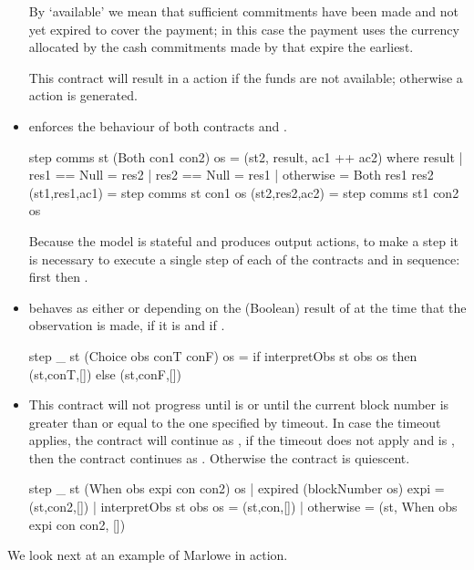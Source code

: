 \documentclass[
      acmsmall
    , screen
  ]{acmart}
\begin{document}
\begin{itemize}
By `available' we mean that sufficient commitments have 
been made and  not yet expired to cover the payment; in this case the payment  uses the currency allocated by the cash 
commitments made by  that expire the earliest.

 This contract will result in a  action if the funds are not available; otherwise a  action is generated.

\item {} enforces the behaviour of both contracts  and . 

\smallskip
\begin{haskellcode}
step comms st (Both con1 con2) os =
    (st2, result, ac1 ++ ac2)
    where
        result | res1 == Null = res2
               | res2 == Null = res1
               | otherwise = Both res1 res2
        (st1,res1,ac1) = step comms st con1 os
        (st2,res2,ac2) = step comms st1 con2 os
\end{haskellcode}
\smallskip

Because the model is stateful and produces output actions, to make a step it is necessary to execute a single step of each of  the contracts  and  in sequence: first  then .

\item {} behaves as either  or  depending on the (Boolean) result of  at the time that the observation is made,  if it is  and  if .

\smallskip
\begin{haskellcode}
step _ st (Choice obs conT conF) os =
    if interpretObs st obs os
        then (st,conT,[])
        else (st,conF,[])
\end{haskellcode}
\smallskip

\item {} This contract will not progress until  is  or until the current block number is greater than or equal to the one specified by timeout. In case the timeout applies, the contract will continue as , if the timeout does not apply and  is , then the contract continues as . Otherwise the contract is quiescent.

\smallskip
\begin{haskellcode}
step _ st (When obs expi con con2) os
  | expired (blockNumber os) expi = (st,con2,[])
  | interpretObs st obs os = (st,con,[])
  | otherwise = (st, When obs expi con con2, [])
  \end{haskellcode}
\smallskip

\end{itemize}
We look next at an example of Marlowe in action.
\end{document}
